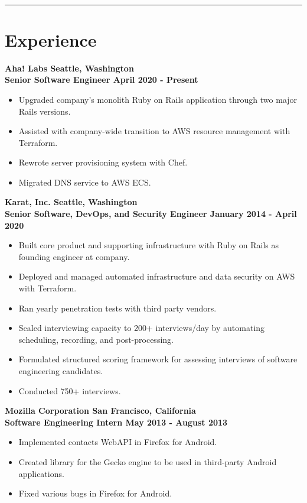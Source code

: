 \documentclass[letterpaper]{article}
\newcommand{\setfontsize}{\fontsize{11.5}{16}\selectfont}
\newcommand{\sectionrule}[1] {
  \noindent\rule{\textwidth}{.1mm}
  \vspace{-11mm}
  \section{#1}
}
\newenvironment{indentsection}
  {\begin{adjustwidth}{10mm}{0pt}}
  {\end{adjustwidth}}
\newcommand{\job}[5] {
  \noindent\textbf{#1 \hfill #2}\\
  \textbf{#3 \hfill #4 - #5}

  \vspace{1mm}
}
\begin{document}
  \setfontsize

  \vspace{2mm}\\

  \sectionrule{Experience}

  \begin{indentsection}
    \job{Aha! Labs}{Seattle, Washington}{Senior Software Engineer}{April 2020}{Present}
    \begin{itemize}
      \item Upgraded company's monolith Ruby on Rails application through two major Rails versions.
      \item Assisted with company-wide transition to AWS resource management with Terraform.
      \item Rewrote server provisioning system with Chef.
      \item Migrated DNS service to AWS ECS.
    \end{itemize}

    \vspace{3mm}

    \job{Karat, Inc.}{Seattle, Washington}{Senior Software, DevOps, and Security Engineer}{January 2014}{April 2020}
    \begin{itemize}
      \item Built core product and supporting infrastructure with Ruby on Rails as founding engineer at company.
      \item Deployed and managed automated infrastructure and data security on AWS with Terraform.
      \item Ran yearly penetration tests with third party vendors.
      \item Scaled interviewing capacity to 200+ interviews/day by automating scheduling, recording, and post-processing.
      \item Formulated structured scoring framework for assessing interviews of software engineering candidates.
      \item Conducted 750+ interviews.
    \end{itemize}

    \vspace{3mm}

    \job{Mozilla Corporation}{San Francisco, California}{Software Engineering Intern}{May 2013}{August 2013}
    \begin{itemize}
      \item Implemented contacts WebAPI in Firefox for Android.
      \item Created library for the Gecko engine to be used in third-party Android applications.
      \item Fixed various bugs in Firefox for Android.
    \end{itemize}
  \end{indentsection}
\end{document}

